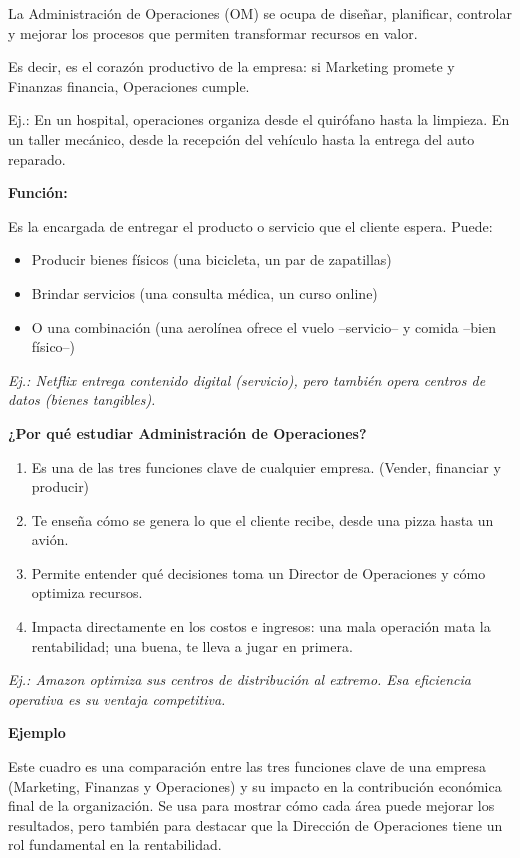 \documentclass[a4paper,oneside,11pt]{article}
\begin{document}
La Administración de Operaciones (OM) se ocupa de diseñar, planificar, controlar y mejorar los procesos que permiten transformar recursos en valor.

Es decir, es el corazón productivo de la empresa: si Marketing promete y Finanzas financia, Operaciones cumple.

Ej.: En un hospital, operaciones organiza desde el quirófano hasta la limpieza. En un taller mecánico, desde la recepción del vehículo hasta la entrega del auto reparado.

\textbf{Función:}

Es la encargada de entregar el producto o servicio que el cliente espera. Puede:
\begin{itemize}
    \item Producir bienes físicos (una bicicleta, un par de zapatillas)
    \item Brindar servicios (una consulta médica, un curso online)
    \item O una combinación (una aerolínea ofrece el vuelo –servicio– y comida –bien físico–)
\end{itemize}

\textit{Ej.: Netflix entrega contenido digital (servicio), pero también opera centros de datos (bienes tangibles).}

\textbf{¿Por qué estudiar Administración de Operaciones?}

\begin{enumerate}
    \item Es una de las tres funciones clave de cualquier empresa. (Vender, financiar y producir)
    \item Te enseña cómo se genera lo que el cliente recibe, desde una pizza hasta un avión.
    \item Permite entender qué decisiones toma un Director de Operaciones y cómo optimiza recursos.
    \item Impacta directamente en los costos e ingresos: una mala operación mata la rentabilidad; una buena, te lleva a jugar en primera.
\end{enumerate}
\textit{Ej.: Amazon optimiza sus centros de distribución al extremo. Esa eficiencia operativa es su ventaja competitiva.}


\textbf{Ejemplo}

Este cuadro es una comparación entre las tres funciones clave de una empresa (Marketing, Finanzas y Operaciones) y su impacto en la contribución económica final de la organización. Se usa para mostrar cómo cada área puede mejorar los resultados, pero también para destacar que la Dirección de Operaciones tiene un rol fundamental en la rentabilidad.
\end{document}
